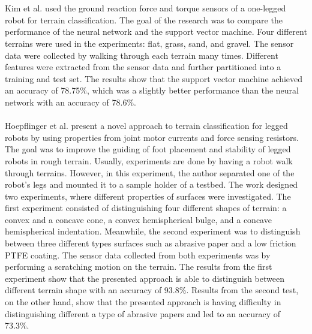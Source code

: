 \documentclass[USenglish]{ifimaster}  %
\begin{document}
\\
\\
Kim et al. \cite{5602459} used the ground reaction force and torque sensors of a one-legged robot for terrain classification. The goal of the research was to compare the performance of the neural network and the support vector machine. Four different terrains were used in the experiments: flat, grass, sand, and gravel. The sensor data were collected by walking through each terrain many times. Different features were extracted from the sensor data and further partitioned into a training and test set. The results show that the support vector machine achieved an accuracy of 78.75\%, which was a slightly better performance than the neural network with an accuracy of 78.6\%.
\\
\\
Hoepflinger et al. \cite{5509309} present a novel approach to terrain classification for legged robots by using properties from joint motor currents and force sensing resistors. The goal was to improve the guiding of foot placement and stability of legged robots in rough terrain. Usually, experiments are done by having a robot walk through terrains. However, in this experiment, the author separated one of the robot’s legs and mounted it to a sample holder of a testbed. The work designed two experiments, where different properties of surfaces were investigated. The first experiment consisted of distinguishing four different shapes of terrain: a convex and a concave cone, a convex hemispherical bulge, and a concave hemispherical indentation. Meanwhile, the second experiment was to distinguish between three different types surfaces such as abrasive paper and a low friction PTFE coating. The sensor data collected from both experiments was by performing a scratching motion on the terrain.  The results from the first experiment show that the presented approach is able to distinguish between different terrain shape with an accuracy of  93.8\%. Results from the second test, on the other hand, show that the presented approach is having difficulty in distinguishing different a type of abrasive papers and led to an accuracy of 73.3\%.
 

\end{document}
